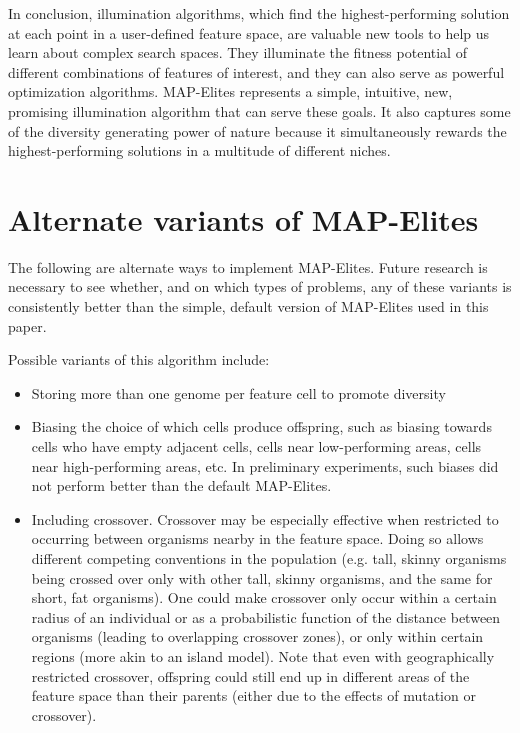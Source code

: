 \documentclass[twocolumn, DIV25, 9pt]{scrartcl}
\begin{document}
In conclusion, illumination algorithms, which find the highest-performing solution at each point in a user-defined feature space, are valuable new tools to help us learn about complex search spaces. They illuminate the fitness potential of different combinations of features of interest, and they can also serve as powerful optimization algorithms. MAP-Elites represents a simple, intuitive, new, promising illumination algorithm that can serve these goals. It also captures some of the diversity generating power of nature because it simultaneously rewards the highest-performing solutions in a multitude of different niches. 

\section{Alternate variants of MAP-Elites}
\label{alternateVersions}

The following are alternate ways to implement MAP-Elites. Future research is necessary to see whether, and on which types of problems, any of these variants is consistently better than the simple, default version of MAP-Elites used in this paper. 


Possible variants of this algorithm include:
\begin{itemize}

\item{Storing more than one genome per feature cell to promote diversity}

\item{Biasing the choice of which cells produce offspring, such as biasing towards cells who have empty adjacent cells, cells near low-performing areas, cells near high-performing areas, etc.} In preliminary experiments, such biases did not perform better than the default MAP-Elites.

\item{Including crossover. Crossover may be especially effective when restricted to occurring between organisms nearby in the feature space. Doing so allows different competing conventions in the population (e.g. tall, skinny organisms being crossed over only with other tall, skinny organisms, and the same for short, fat organisms). One could make crossover only occur within a certain radius of an individual or as a probabilistic function of the distance between organisms (leading to overlapping crossover zones), or only within certain regions (more akin to an island model). Note that even with geographically restricted crossover, offspring could still end up in different areas of the feature space than their parents (either due to the effects of mutation or crossover).}


\end{itemize} 
\end{document}
